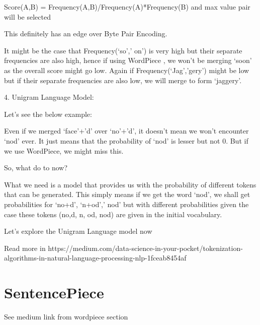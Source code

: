 Score(A,B) = Frequency(A,B)/Frequency(A)*Frequency(B) and max value pair will be selected

This definitely has an edge over Byte Pair Encoding.

It might be the case that Frequency(‘so’,’ on’) is very high but their separate frequencies are also high, hence if using WordPiece , we won’t be merging ‘soon’ as the overall score might go low. Again if Frequency(‘Jag’,’gery’) might be low but if their separate frequencies are also low, we will merge to form ‘jaggery’.

4. Unigram Language Model:

Let’s see the below example:

Even if we merged ‘face’+’d’ over ‘no’+’d’, it doesn’t mean we won’t encounter ‘nod’ ever. It just means that the probability of ‘nod’ is lesser but not 0. But if we use WordPiece, we might miss this.

So, what do to now?

What we need is a model that provides us with the probability of different tokens that can be generated. This simply means if we get the word ‘nod’, we shall get probabilities for ‘no+d’, ‘n+od’,’ nod’ but with different probabilities given the case these tokens (no,d, n, od, nod) are given in the initial vocabulary.

Let’s explore the Unigram Language model now

Read more in https://medium.com/data-science-in-your-pocket/tokenization-algorithms-in-natural-language-processing-nlp-1fceab8454af

\section{{SentencePiece}}

See medium link from wordpiece section

